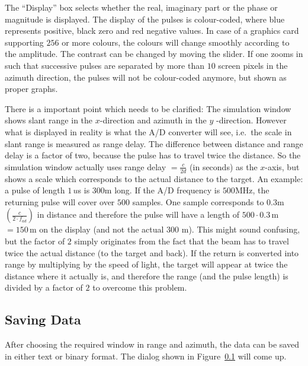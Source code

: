 The ``Display'' box selects whether the real, imaginary part or the phase or
magnitude is displayed. The display of the pulses is colour-coded, where
blue represents positive, black zero and red negative values. In case of a
graphics card supporting $256$ or more colours, the colours will change
smoothly according to the amplitude. The contrast can be changed by moving
the slider. If one zooms in such that successive pulses are separated by
more than $10$ screen pixels in the azimuth direction, the pulses will not
be colour-coded anymore, but shown as proper graphs.

There is a important point which needs to be clarified: The simulation
window shows slant range in the $x$-direction and azimuth in the $y$%
-direction. However what is displayed in reality is what the A/D converter
will see, i.e.~the scale in slant range is measured as range delay. The
difference between distance and range delay is a factor of two, because the
pulse has to travel twice the distance. So the simulation window actually
uses range delay $=\frac{c}{2d}$ (in seconds) as the $x$-axis, but shows a
scale which corresponds to the actual distance to the target. An example: a
pulse of length $1\,u$s is $300$\thinspace m long. If the A/D frequency is $%
500$\thinspace MHz, the returning pulse will cover over $500$ samples. One
sample corresponds to $0.3$\thinspace m $\left( \frac{c}{2\cdot f_{ad}}%
\right) $ in distance and therefore the pulse will have a length of $%
500\cdot 0.3\,$m $=150\,$m on the display (and not the actual $300$%
\thinspace m). This might sound confusing, but the factor of $2$ simply
originates from the fact that the beam has to travel twice the actual
distance (to the target and back). If the return is converted into range by
multiplying by the speed of light, the target will appear at twice the
distance where it actually is, and therefore the range (and the pulse
length) is divided by a factor of $2$ to overcome this problem.

\subsection{Saving Data}

\label{savedata}After choosing the required window in range and azimuth, the
data can be saved in either text or binary format. The dialog shown in
Figure~\ref{savedata} will come up.


